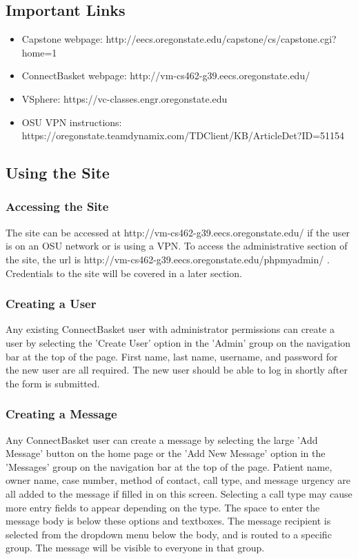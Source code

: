 \documentclass[onecolumn, draftclsnofoot,10pt, compsoc]{IEEEtran}
\begin{document}
\subsection{Important Links}
\begin{itemize}
\item Capstone webpage: http://eecs.oregonstate.edu/capstone/cs/capstone.cgi?home=1
\item ConnectBasket webpage: http://vm-cs462-g39.eecs.oregonstate.edu/
\item VSphere: https://vc-classes.engr.oregonstate.edu
\item OSU VPN instructions: https://oregonstate.teamdynamix.com/TDClient/KB/ArticleDet?ID=51154 
\end{itemize}

\subsection{Using the Site}

\subsubsection{Accessing the Site}
The site can be accessed at http://vm-cs462-g39.eecs.oregonstate.edu/ if the user is on an OSU network or is using a VPN. To access the administrative section of the site, the url is http://vm-cs462-g39.eecs.oregonstate.edu/phpmyadmin/ . Credentials to the site will be covered in a later section.

\subsubsection{Creating a User}
Any existing ConnectBasket user with administrator permissions can create a user by selecting the 'Create User' option in the 'Admin' group on the navigation bar at the top of the page. First name, last name, username, and password for the new user are all required. The new user should be able to log in shortly after the form is submitted.

\subsubsection{Creating a Message}
Any ConnectBasket user can create a message by selecting the large 'Add Message' button on the home page or the 'Add New Message' option in the 'Messages' group on the navigation bar at the top of the page. Patient name, owner name, case number, method of contact, call type, and message urgency are all added to the message if filled in on this screen. Selecting a call type may cause more entry fields to appear depending on the type. The space to enter the message body is below these options and textboxes. The message recipient is selected from the dropdown menu below the body, and is routed to a specific group. The message will be visible to everyone in that group.
\end{document}
